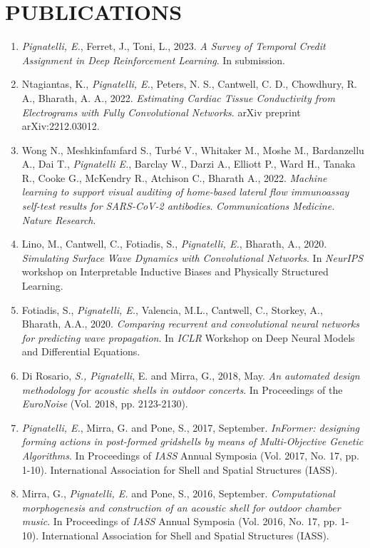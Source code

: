 \section*{PUBLICATIONS}
\begin{enumerate}[leftmargin=0.45cm, itemsep=0em, topsep=0.5em, parsep=0.2em]
    \item \emph{Pignatelli, E.}, Ferret, J., Toni, L., 2023. \textit{A Survey of Temporal Credit Assignment in Deep Reinforcement Learning}. In submission.
    \item Ntagiantas, K., \emph{Pignatelli, E.}, Peters, N. S., Cantwell, C. D., Chowdhury, R. A., Bharath, A. A., 2022. \textit{Estimating Cardiac Tissue Conductivity from Electrograms with Fully Convolutional Networks}. arXiv preprint arXiv:2212.03012.
    \item Wong N., Meshkinfamfard S., Turbé V., Whitaker M., Moshe M., Bardanzellu A., Dai T., \emph{Pignatelli E.}, Barclay W., Darzi A., Elliott P., Ward H., Tanaka R., Cooke G., McKendry R., Atchison C., Bharath A., 2022. \textit{Machine learning to support visual auditing of home-based lateral flow immunoassay self-test results for SARS-CoV-2 antibodies}. \emph{Communications Medicine. Nature Research}.
    \item Lino, M., Cantwell, C., Fotiadis, S., \emph{Pignatelli, E.}, Bharath, A., 2020. \textit{Simulating Surface Wave Dynamics with Convolutional Networks}. In \emph{NeurIPS} workshop on Interpretable Inductive Biases and Physically Structured Learning.
    \item Fotiadis, S., \emph{Pignatelli, E.}, Valencia, M.L., Cantwell, C., Storkey, A., Bharath, A.A., 2020. \textit{Comparing recurrent and convolutional neural networks for predicting wave propagation}. In \emph{ICLR} Workshop on Deep Neural Models and Differential Equations.
    \item Di Rosario, \emph{S., Pignatelli}, E. and Mirra, G., 2018, May. \textit{An automated design methodology for acoustic shells in outdoor concerts}. In Proceedings of the \emph{EuroNoise} (Vol. 2018, pp. 2123-2130).
    \item \emph{Pignatelli, E.}, Mirra, G. and Pone, S., 2017, September. \textit{InFormer: designing forming actions in post-formed gridshells by means of Multi-Objective Genetic Algorithms}. In Proceedings of \emph{IASS} Annual Symposia (Vol. 2017, No. 17, pp. 1-10). International Association for Shell and Spatial Structures (IASS).
    \item Mirra, G., \emph{Pignatelli, E.} and Pone, S., 2016, September. \textit{Computational morphogenesis and construction of an acoustic shell for outdoor chamber music}. In Proceedings of \emph{IASS} Annual Symposia (Vol. 2016, No. 17, pp. 1-10). International Association for Shell and Spatial Structures (IASS).

\end{enumerate}
